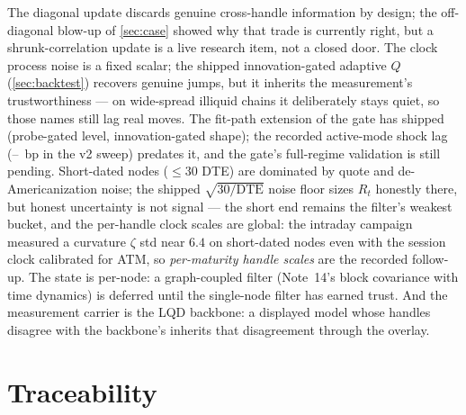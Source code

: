 \documentclass[11pt]{article}
\begin{document}
The diagonal update discards genuine cross-handle information by design; the
off-diagonal blow-up of \cref{sec:case} showed why that trade is currently
right, but a shrunk-correlation update is a live research item, not a closed
door. The clock process noise is a fixed scalar; the shipped
innovation-gated adaptive $Q$ (\cref{sec:backtest}) recovers genuine jumps,
but it inherits the measurement's trustworthiness --- on wide-spread
illiquid chains it deliberately stays quiet, so those names still lag real
moves.  The fit-path extension of the gate has shipped (probe-gated level,
innovation-gated shape); the recorded active-mode shock lag
(\KalActShockSpike--\KalActShockHigh\ bp in the v2 sweep) predates it, and
the gate's full-regime validation is still pending. Short-dated nodes ($\le30$ DTE) are dominated by quote and
de-Americanization noise; the shipped $\sqrt{30/\mathrm{DTE}}$ noise floor
sizes $R_t$ honestly there, but honest uncertainty is not signal --- the
short end remains the filter's weakest bucket, and the per-handle clock
scales are global: the intraday campaign measured a curvature $\zeta$ std
near $6.4$ on short-dated nodes even with the session clock calibrated for
ATM, so \emph{per-maturity handle scales} are the recorded follow-up. The state is per-node: a graph-coupled filter
(Note~14's block covariance with time dynamics) is deferred until the
single-node filter has earned trust. And the measurement carrier is the LQD
backbone: a displayed model whose handles disagree with the backbone's inherits
that disagreement through the overlay.

\section{Traceability}
\label{sec:traceability}
\end{document}
